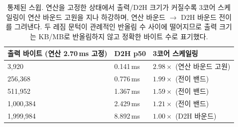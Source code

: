 \documentclass[11pt]{article}
\begin{document}
\begin{table}[htbp]
\centering
\small
\begin{tabular}{R{3.8cm} R{2.0cm} L{4.8cm}}
\toprule
\textbf{출력 바이트 (연산 2.70\,ms 고정)} & \textbf{D2H p50} & \textbf{3코어 스케일링} \\
920     & 0.141\,ms & $2.98\times$ (연산 바운드 고원) \\
256{,}368   & 0.776\,ms & $1.99\times$ (전이 밴드) \\
511{,}952   & 1.367\,ms & $1.59\times$ (전이 밴드) \\
1{,}000{,}384 & 2.429\,ms & $1.21\times$ (전이 밴드) \\
1{,}999{,}984 & 8.892\,ms & $1.00\times$ (D2H 바운드) \\
\bottomrule
\end{tabular}
\caption{통제된 스윕. 연산을 고정한 상태에서 출력/D2H 크기가 커질수록 3코어 스케일링이 연산 바운드 고원을 지나 하강하며, 연산 바운드 $\to$ D2H 바운드 전이를 그려낸다. 두 레짐 문턱이 관례적인 반올림 수 사이에 떨어지므로 출력 크기는 KB/MB로 반올림하지 않고 정확한 바이트 수로 표기했다.}
\label{tab:c4sweep}
\end{table}
\end{document}
